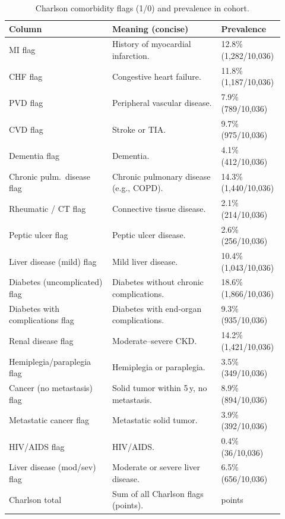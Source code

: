 \vspace{0.75\baselineskip}
\begin{table}[t]\centering
{\footnotesize\renewcommand{\arraystretch}{1.12}\setlength{\tabcolsep}{4pt}%
\caption{Charlson comorbidity flags (1/0) and prevalence in cohort.}
\label{app:tab-charlson}
\begin{tabular}{P{0.36\linewidth} P{0.38\linewidth} P{0.18\linewidth}}
\toprule
\textbf{Column} & \textbf{Meaning (concise)} & \textbf{Prevalence}\\
\midrule
MI flag        & History of myocardial infarction.                      & 12.8\% (1,282/10,036)\\
CHF flag     & Congestive heart failure.                              & 11.8\% (1,187/10,036)\\
PVD flag  & Peripheral vascular disease.                           & 7.9\% (789/10,036)\\
CVD flag      & Stroke or TIA.                                         & 9.7\% (975/10,036)\\
Dementia flag                     & Dementia.                                              & 4.1\% (412/10,036)\\
Chronic pulm.\ disease flag    & Chronic pulmonary disease (e.g., COPD).                & 14.3\% (1,440/10,036)\\
Rheumatic / CT flag& Connective tissue disease.                             & 2.1\% (214/10,036)\\
Peptic ulcer flag         & Peptic ulcer disease.                                  & 2.6\% (256/10,036)\\
Liver disease (mild) flag         & Mild liver disease.                                    & 10.4\% (1,043/10,036)\\
Diabetes (uncomplicated) flag  & Diabetes without chronic complications.                & 18.6\% (1,866/10,036)\\
Diabetes with complications flag  & Diabetes with end-organ complications.                 & 9.3\% (935/10,036)\\
Renal disease flag                & Moderate--severe CKD.               & 14.2\% (1,421/10,036)\\
Hemiplegia/paraplegia flag        & Hemiplegia or paraplegia.                              & 3.5\% (349/10,036)\\
Cancer (no metastasis) flag       & Solid tumor within 5\,y, no metastasis.                & 8.9\% (894/10,036)\\
Metastatic cancer flag            & Metastatic solid tumor.                                & 3.9\% (392/10,036)\\
HIV/AIDS flag                     & HIV/AIDS.                                              & 0.4\% (36/10,036)\\
Liver disease (mod/sev) flag & Moderate or severe liver disease.                    & 6.5\% (656/10,036)\\
Charlson total                    & Sum of all Charlson flags (points).                    & points\\
\bottomrule
\end{tabular}}
\end{table}

